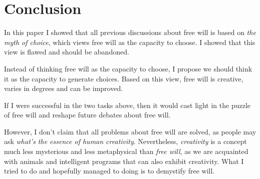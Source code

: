 \section{Conclusion}

In this paper I showed that all previous discussions about free will is based on \emph{the myth of choice}, which views free will as the capacity to choose. I showed that this view is flawed and should be abandoned.

Instead of thinking free will as the capacity to choose, I propose we should think it as the capacity to generate choices. Based on this view, free will is creative, varies in degrees and can be improved.

If I were successful in the two tasks above, then it would cast light in the puzzle of free will and reshape future debates about free will.

However, I don't claim that all problems about free will are solved, as people may ask \emph{what's the essence of human creativity}. Nevertheless, \emph{creativity} is a concept much less mysterious and less metaphysical than \emph{free will}, as we are acquainted with animals and intelligent programs that can also exhibit creativity. What I tried to do and hopefully managed to doing is to demystify free will.

